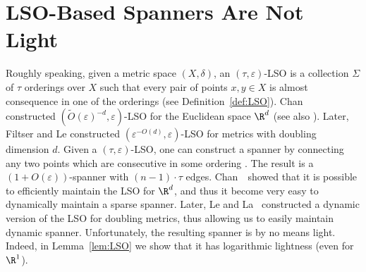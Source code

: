 \documentclass[11pt]{article}
\def\eps{\varepsilon}
\begin{document}
 \appendix   

\section{LSO-Based Spanners Are Not Light}\label{sec:LSO}
Roughly speaking, given a metric space $(X,\delta)$, an $(\tau,\varepsilon)$-LSO is a collection $\Sigma$ of $\tau$ orderings over $X$ such that every pair of points $x,y\in X$ is almost consequence in one of the orderings (see Definition~\ref{def:LSO}).
Chan \etal~\cite{chan2020locality} constructed $(\tilde{O}(\eps)^{-d},\eps)$-LSO for the Euclidean space $\R^d$ (see also \cite{GaoH24}).
Later, Filtser and Le \cite{filtser2022locality} constructed  $(\eps^{-O(d)},\eps)$-LSO for metrics with doubling dimension $d$.
Given a $(\tau,\eps)$-LSO, one can construct a spanner by connecting any two points which are consecutive in some ordering \cite{chan2020locality}. The result is a $(1+O(\eps))$-spanner with $(n-1)\cdot \tau$ edges. 
Chan~\etal~showed that it is possible to efficiently maintain the LSO for $\R^d$, and thus it become very easy to dynamically maintain a sparse spanner.
Later,  Le and La~\cite{la2025dynamic} constructed a dynamic version of the LSO for doubling metrics, thus allowing us to easily maintain dynamic spanner.
Unfortunately, the resulting spanner is by no means light. Indeed, in Lemma~\ref{lem:LSO}  we show that it has logarithmic lightness (even for $\R^1$).
\end{document}
